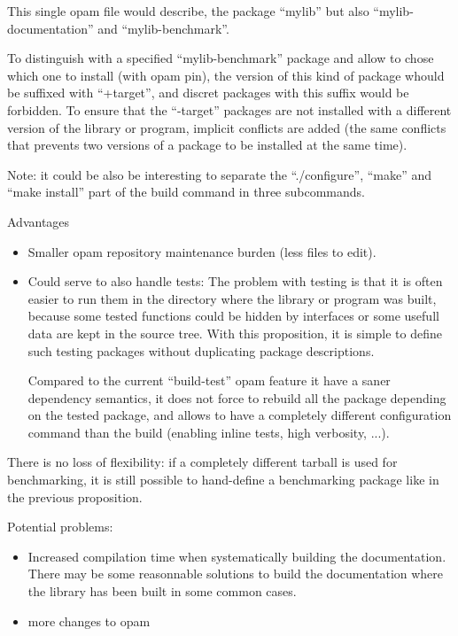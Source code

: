 \documentclass[11pt,a4paper]{article}
\begin{document}
This single opam file would describe, the package ``mylib'' but also
``mylib-documentation'' and ``mylib-benchmark''.

To distinguish with a specified ``mylib-benchmark'' package and allow
to chose which one to install (with opam pin), the version of this
kind of package whould be suffixed with ``+target'', and discret
packages with this suffix would be forbidden. To ensure that the
``-target'' packages are not installed with a different version of the
library or program, implicit conflicts are added (the same conflicts
that prevents two versions of a package to be installed at the same
time).

Note: it could be also be interesting to separate the ``./configure'',
``make'' and ``make install'' part of the build command in three
subcommands.

Advantages
\begin{itemize}
\item Smaller opam repository maintenance burden (less files to edit).
\item Could serve to also handle tests: The problem with testing is
  that it is often easier to run them in the directory where the
  library or program was built, because some tested functions could be
  hidden by interfaces or some usefull data are kept in the source
  tree. With this proposition, it is simple to define such testing
  packages without duplicating package descriptions.

  Compared to the current ``build-test'' opam feature it have a saner
  dependency semantics, it does not force to rebuild all the package
  depending on the tested package, and allows to have a completely
  different configuration command than the build (enabling inline
  tests, high verbosity, ...).
\end{itemize}

There is no loss of flexibility: if a completely different tarball is
used for benchmarking, it is still possible to hand-define a
benchmarking package like in the previous proposition.

Potential problems:
\begin{itemize}
\item Increased compilation time when systematically building the
  documentation. There may be some reasonnable solutions to build the
  documentation where the library has been built in some common cases.
\item more changes to opam
\end{itemize}
\end{document}
